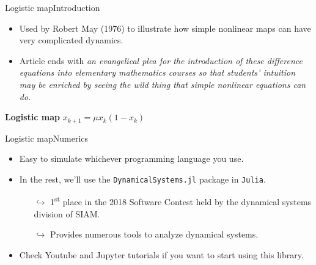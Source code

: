 \documentclass[usenames,dvipsnames,svgnames,10pt,aspectratio=169]{beamer}
\begin{document}
\begin{frame}[t, c]{Logistic map}{Introduction}
	\begin{minipage}{.68\textwidth}
		\begin{itemize}
			\item Used by Robert May (1976) to illustrate how simple nonlinear maps can have very complicated dynamics.

			\medskip

			\item Article ends with \emph{an evangelical plea for the introduction of these difference equations into elementary mathematics courses so that students' intuition may be enriched by seeing the wild thing that simple nonlinear equations can do.}
		\end{itemize}
	\end{minipage}%
	\hfill
	\begin{minipage}{.28\textwidth}
		\centering
		\begin{block}{\centering \textbf{Logistic map}}
			\centering
			\(	x_{k+1} = \mu x_k \left( 1 - x_k \right) \)
		\end{block}
	\end{minipage}

	\vspace{1cm}
\end{frame}

\begin{frame}[t, c]{Logistic map}{Numerics}
	\begin{minipage}{.38\textwidth}
		\centering
		
	\end{minipage}%
	\hfill
	\begin{minipage}{.58\textwidth}
		\begin{itemize}
			\item Easy to simulate whichever programming language you use.

			\bigskip

			\item In the rest, we'll use the \texttt{DynamicalSystems.jl} package in \texttt{Julia}.
			\begin{itemize}
				\item[\( \hookrightarrow \)] 1\textsuperscript{st} place in the 2018 Software Contest held by the dynamical systems division of SIAM.

				\item[\( \hookrightarrow \)] Provides numerous tools to analyze dynamical systems.
			\end{itemize}

			\medskip

			\item Check Youtube and Jupyter tutorials if you want to start using this library.
		\end{itemize}
	\end{minipage}

	\vspace{1cm}
\end{frame}
\end{document}
